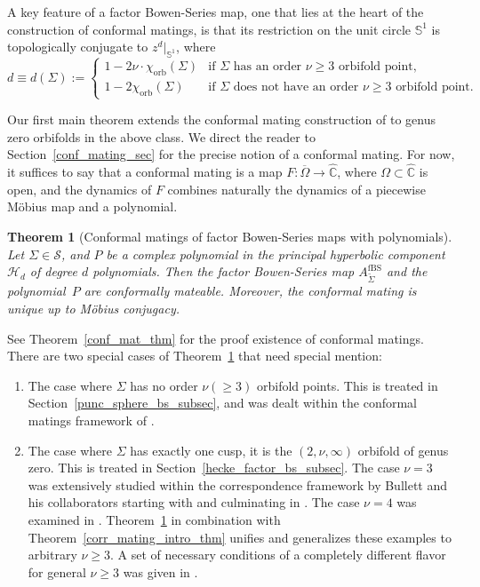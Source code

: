 \documentclass[JEP,XML,SOM,Unicode,NoFloatCountersInSection,published]{cedram}
\newtheorem{thmx}{Theorem}
\theoremstyle{definition}
\theoremstyle{remark}
\newcommand{\cS}{\mathcal{S}}
\begin{document}
A key feature of a factor Bowen-Series map, one that lies at the heart of the construction of conformal matings, is that its restriction on the unit circle $\mathbb{S}^1$ is topologically conjugate to $z^d\vert_{\mathbb{S}^1}$, where
\[
d\equiv d(\Sigma):=
\begin{cases}
1-2\nu\cdot\chi_{\mathrm{orb}}(\Sigma)& \text{if $\Sigma$ has an order $\nu\geq 3$ orbifold point},\\
1-2\chi_{\mathrm{orb}}(\Sigma)& \text{if $\Sigma$ does not have an order $\nu\geq 3$ orbifold point}.
\end{cases}
\]

Our first main theorem extends the conformal mating construction of \cite{MM1} to genus zero orbifolds in the above class.
We direct the reader to Section~\ref{conf_mating_sec} for the precise notion of a conformal mating. For now, it suffices to say that a conformal mating is a map $F: \overline{\Omega} \to \widehat{\mathbb{C}}$, where ${\Omega} \subset \widehat{\mathbb{C}}$ is open, and the dynamics of $F$ combines naturally the dynamics of a piecewise Möbius map and a polynomial.

\begin{thmx}[Conformal matings of factor Bowen-Series maps with polynomials]\label{conf_mating_intro_thm}
Let $\Sigma\!\in\!\cS$, and $P$ be a complex polynomial in the principal hyperbolic component~$\mathcal{H}_d$ of degree $d$ polynomials. Then the factor Bowen-Series map $A_{\widetilde{\Sigma}}^{\mathrm{fBS}}$ and the polynomial~$P$ are conformally mateable. Moreover, the conformal mating is unique up to Möbius conjugacy.
\end{thmx}

See Theorem~\ref{conf_mat_thm} for the proof existence of conformal matings.
There are two special cases of Theorem~\ref{conf_mating_intro_thm} that need special mention:
\begin{enumerate}
\item The case where $\Sigma$ has no order $\nu (\geq 3)$ orbifold points. This is treated in Section~\ref{punc_sphere_bs_subsec}, and was dealt within the conformal matings framework of \cite{MM1}.
\item The case where $\Sigma$ has exactly one cusp, \ie it is the $(2,\nu,\infty)$ orbifold of genus zero. This is treated in Section~\ref{hecke_factor_bs_subsec}. The case $\nu=3$ was extensively studied within the correspondence framework by Bullett and his collaborators starting with \cite{BP94} and culminating in \cite{BL20a,BL20b,BL22}. The case $\nu=4$ was examined
in \cite{BF05}. Theorem~\ref{conf_mating_intro_thm} in combination with Theorem~\ref{corr_mating_intro_thm} unifies and generalizes these examples
to arbitrary $\nu\geq 3$. A set of
necessary conditions of a completely different flavor for general $\nu \geq 3$ was given in \cite{B00,BH00}.
\end{enumerate}
\end{document}
